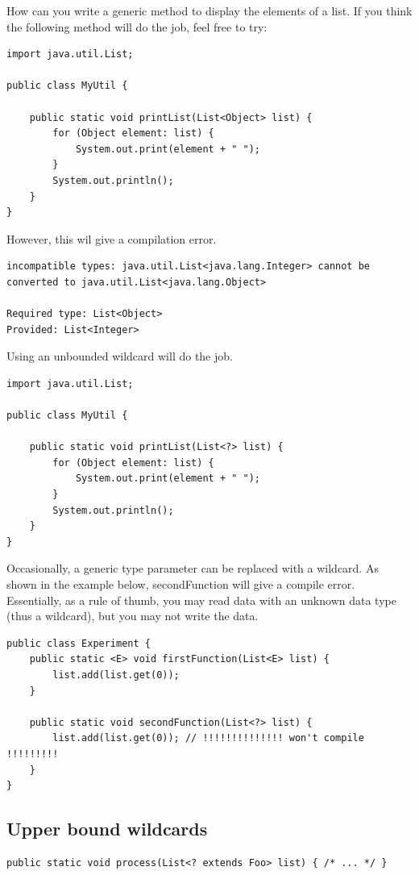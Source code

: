 How can you write a generic method to display the elements of a list. 
If you think the following method will do the job, feel free to try:

\begin{lstlisting}
import java.util.List;

public class MyUtil {

	public static void printList(List<Object> list) {
		for (Object element: list) {
			System.out.print(element + " ");
		}
		System.out.println();
	}
}
\end{lstlisting}

However, this wil give a compilation error.

\begin{verbatim}
incompatible types: java.util.List<java.lang.Integer> cannot be converted to java.util.List<java.lang.Object>

Required type: List<Object>
Provided: List<Integer>
\end{verbatim}

Using an unbounded wildcard will do the job. 
\begin{lstlisting}
import java.util.List;

public class MyUtil {

	public static void printList(List<?> list) {
		for (Object element: list) {
			System.out.print(element + " ");
		}
		System.out.println();
	}
}
\end{lstlisting}

Occasionally,  a generic type parameter can be replaced with a wildcard. 
As shown in the example below, secondFunction will give a compile error.  Essentially, as a rule of thumb, you may read data with an unknown data type (thus a wildcard), but you may not write the data.

\begin{lstlisting}
public class Experiment {
    public static <E> void firstFunction(List<E> list) {
        list.add(list.get(0));
    }

    public static void secondFunction(List<?> list) {
        list.add(list.get(0)); // !!!!!!!!!!!!!! won't compile !!!!!!!!!
    }
}
\end{lstlisting}

\subsection{Upper bound wildcards}

\begin{lstlisting}
public static void process(List<? extends Foo> list) { /* ... */ }
\end{lstlisting}

